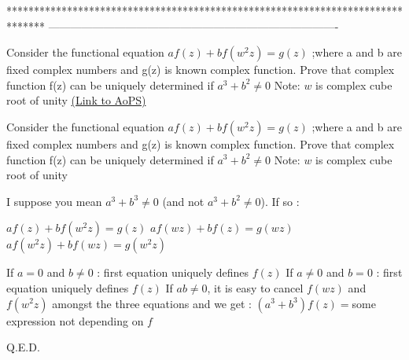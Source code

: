 *******************************************************************************
-------------------------------------------------------------------------------

\begin{problem}
	Consider the functional equation $af(z)+bf(w^2z)=g(z)$ ;where a and b are fixed complex numbers and g(z) is known complex function. Prove that complex function f(z) can be uniquely determined if $a^3+b^2 \neq 0$
Note: $w$ is complex cube root of unity
	\flushright \href{https://artofproblemsolving.com/community/c6h1621785}{(Link to AoPS)}
\end{problem}



\begin{solution}
	\begin{tcolorbox}Consider the functional equation $af(z)+bf(w^2z)=g(z)$ ;where a and b are fixed complex numbers and g(z) is known complex function. Prove that complex function f(z) can be uniquely determined if $a^3+b^2 \neq 0$
Note: $w$ is complex cube root of unity\end{tcolorbox}
I suppose you mean $a^3+b^3\ne 0$ (and not $a^3+b^2\ne 0$). If so :

$af(z)+bf(w^2z)=g(z)$
$af(wz)+bf(z)=g(wz)$
$af(w^2z)+bf(wz)=g(w^2z)$

If $a=0$ and $b\ne 0$ : first equation uniquely defines $f(z)$
If $a\ne 0$ and $b=0$ : first equation uniquely defines $f(z)$
If $ab\ne 0$, it is easy to cancel $f(wz)$ and $f(w^2z)$ amongst the three equations and we get :
$(a^3+b^3)f(z)=$some expression not depending on $f$

Q.E.D.



\end{solution}



